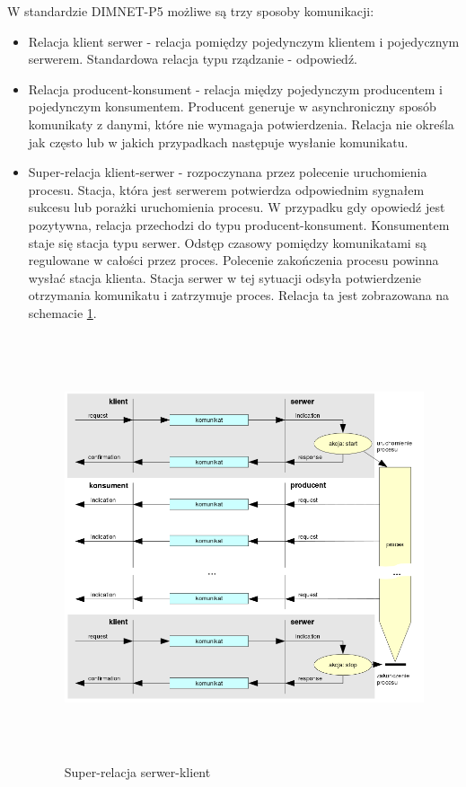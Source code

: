 W standardzie DIMNET-P5 możliwe są trzy sposoby komunikacji:
\begin{itemize}
\item Relacja klient serwer - relacja pomiędzy pojedynczym klientem i pojedycznym serwerem. Standardowa relacja typu rządzanie - odpowiedź.
\item Relacja producent-konsument - relacja między pojedynczym producentem i pojedynczym konsumentem. Producent generuje w asynchroniczny sposób komunikaty z danymi, które nie wymagaja potwierdzenia. Relacja nie określa jak często lub w jakich przypadkach następuje wysłanie komunikatu.
\item Super-relacja klient-serwer - rozpoczynana przez polecenie uruchomienia procesu. Stacja, która jest serwerem potwierdza odpowiednim sygnałem sukcesu lub porażki uruchomienia procesu. W przypadku gdy opowiedź jest pozytywna, relacja przechodzi do typu producent-konsument. Konsumentem staje się stacja typu serwer. Odstęp czasowy pomiędzy komunikatami są regulowane w całości przez proces. Polecenie zakończenia procesu powinna wysłać stacja klienta. Stacja serwer w tej sytuacji odsyła potwierdzenie otrzymania komunikatu i zatrzymuje proces. Relacja ta jest zobrazowana na schemacie \ref{fig:dimnetp5}.

	\begin{figure}[t]
		\includegraphics[height=125mm]{./img/dimnet-p5.png}
		\caption{Super-relacja serwer-klient}
		\label{fig:dimnetp5}
	\end{figure}
\end{itemize}

